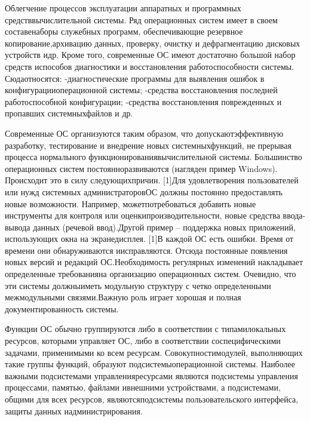 Облегчение процессов эксплуатации аппаратных и программных средстввычислительной системы. Ряд операционных систем имеет в своем составенаборы   служебных   программ,   обеспечивающие   резервное   копирование,архивацию данных, проверку, очистку и дефрагментацию дисковых устройств идр. Кроме того, современные ОС имеют достаточно большой набор средств испособов диагностики и восстановления работоспособности системы. Сюдаотносятся: -диагностические программы для выявления ошибок в конфигурацииоперационной системы; -средства восстановления последней работоспособной конфигурации; -средства   восстановления   поврежденных   и   пропавших   системныхфайлов и др.~\cite{Oc1}

Современные   ОС   организуются   таким   образом,   что   допускаютэффективную   разработку,   тестирование   и   внедрение   новых   системныхфункций,   не   прерывая   процесса   нормального   функционированиявычислительной   системы.   Большинство   операционных   систем   постоянноразвиваются (нагляден пример Windows). Происходит это в силу следующихпричин. [1]Для удовлетворения пользователей или нужд системных администраторовОС должны постоянно предоставлять новые возможности. Например, можетпотребоваться   добавить   новые   инструменты   для   контроля   или   оценкипроизводительности,   новые   средства   ввода-вывода   данных   (речевой   ввод).Другой пример – поддержка новых приложений, использующих окна на экранедисплея. [1]В каждой ОС есть ошибки. Время от времени они обнаруживаются иисправляются. Отсюда постоянные появления новых версий и редакций ОС.Необходимость регулярных изменений накладывает определенные требованияна организацию операционных систем. Очевидно, что эти системы должныиметь модульную структуру с четко определенными межмодульными связями.Важную роль играет хорошая и полная документированность системы.~\cite{Oc1}

Функции   ОС   обычно   группируются   либо   в   соответствии   с   типамилокальных   ресурсов,   которыми   управляет   ОС,   либо   в   соответствии   соспецифическими задачами, применимыми ко всем ресурсам. Совокупностимодулей,   выполняющих   такие   группы   функций,   образуют   подсистемыоперационной   системы.   Наиболее   важными   подсистемами   управленияресурсами являются подсистемы управления процессами, памятью, файлами ивнешними устройствами, а подсистемами, общими для всех ресурсов, являютсяподсистемы   пользовательского   интерфейса,   защиты   данных   иадминистрирования.~\cite{Oc2}


